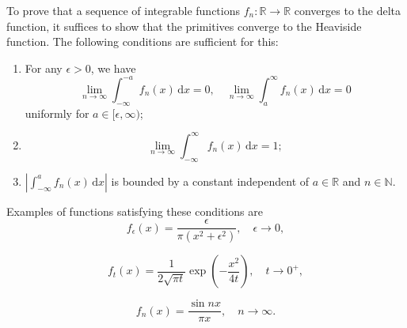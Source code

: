 \begin{Example}
\label{ex:delta-sequence-primitive}
To prove that a sequence of integrable functions $f_n:\mathbb{R}\to\mathbb{R}$ converges to the delta function, it suffices to show that the primitives converge to the Heaviside function. The following conditions are sufficient for this:
\begin{enumerate}\item For any $\epsilon>0$, we have
\begin{equation}\label{eq:delta-sequence-uniform-tail-integrals}
\lim_{n\to\infty}\int_{-\infty}^{-a}f_n(x)\,\mathrm{d}x=0,\quad\lim_{n\to\infty}\int_a^\infty f_n(x)\,\mathrm{d}x=0
\end{equation}
uniformly for $a\in[\epsilon,\infty)$;
\item 
\begin{equation}\label{eq:delta-sequence-unit-integral-limit}
\lim_{n\to\infty}\int_{-\infty}^\infty f_n(x)\,\mathrm{d}x=1;
\end{equation}

\item $\left|\int_{-\infty}^af_n(x)\,\mathrm{d}x\right|$ is bounded by a constant independent of $a\in\mathbb{R}$ and $n\in\mathbb{N}$.
\end{enumerate}
Examples of functions satisfying these conditions are
\begin{equation}\label{eq:cauchy-kernel-delta-sequence}
f_\epsilon(x)=\dfrac{\epsilon}{\pi(x^2+\epsilon^2)},\quad\epsilon\to0,
\end{equation}

\begin{equation}\label{eq:heat-kernel-delta-sequence}
f_t(x)=\dfrac1{2\sqrt{\pi t}}\exp\left(-\dfrac{x^2}{4t}\right),\quad t\to0^+,
\end{equation}

\begin{equation}\label{eq:sinc-kernel-delta-sequence}
f_n(x)=\dfrac{\sin nx}{\pi x},\quad n\to\infty.
\end{equation}

\end{Example}
